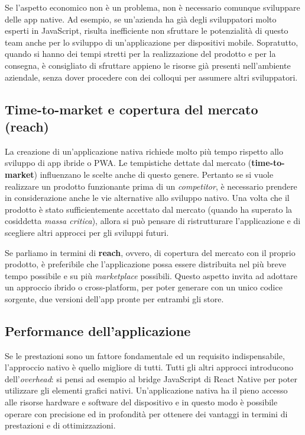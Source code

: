 Se l'aspetto economico non è un problema, non è necessario comunque sviluppare delle app native. Ad esempio, se un'azienda ha già degli sviluppatori molto esperti in JavaScript, risulta inefficiente non sfruttare le potenzialità di questo team anche per lo sviluppo di un'applicazione per dispositivi mobile. Sopratutto, quando si hanno dei tempi stretti per la realizzazione del prodotto e per la consegna, è consigliato di sfruttare appieno le risorse già presenti nell'ambiente aziendale, senza dover procedere con dei colloqui per assumere altri sviluppatori.

\subsection{Time-to-market e copertura del mercato (reach)}
La creazione di un'applicazione nativa richiede molto più tempo rispetto allo sviluppo di app ibride o PWA. Le tempistiche dettate dal mercato (\textbf{time-to-market}) influenzano le scelte anche di questo genere. Pertanto se si vuole realizzare un prodotto funzionante prima di un \textit{competitor}, è necessario prendere in considerazione anche le vie alternative allo sviluppo nativo. Una volta che il prodotto è stato sufficientemente accettato dal mercato (quando ha superato la cosiddetta \textit{massa critica}), allora si può pensare di ristrutturare l'applicazione e di scegliere altri approcci per gli sviluppi futuri.

Se parliamo in termini di \textbf{reach}, ovvero, di copertura del mercato con il proprio prodotto, è preferibile che l'applicazione possa essere distribuita nel più breve tempo possibile e su più \textit{marketplace} possibili. Questo aspetto invita ad adottare un approccio ibrido o cross-platform, per poter generare con un unico codice sorgente, due versioni dell'app pronte per entrambi gli store.

\subsection{Performance dell'applicazione}
Se le prestazioni sono un fattore fondamentale ed un requisito indispensabile, l'approccio nativo è quello migliore di tutti. Tutti gli altri approcci introducono dell'\textit{overhead}: si pensi ad esempio al bridge JavaScript di React Native per poter utilizzare gli elementi grafici nativi. Un'applicazione nativa ha il pieno accesso alle risorse hardware e software del dispositivo e in questo modo è possibile operare con precisione ed in profondità per ottenere dei vantaggi in termini di prestazioni e di ottimizzazioni.

